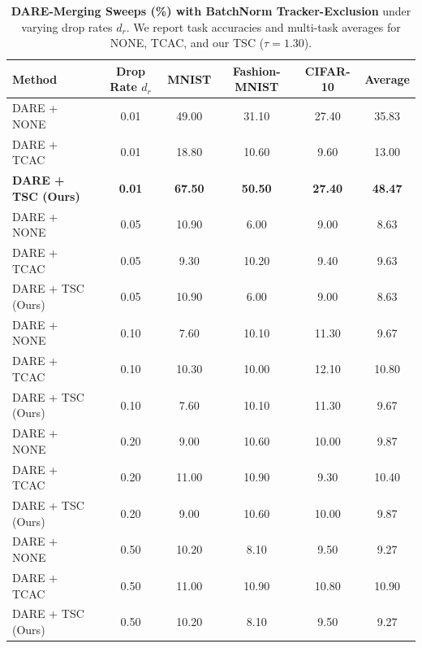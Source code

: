 \documentclass{article}
\theoremstyle{plain}
\theoremstyle{definition}
\theoremstyle{remark}
\begin{document}
\begin{table}[h]
\caption{\textbf{DARE-Merging Sweeps (\%) with BatchNorm Tracker-Exclusion} under varying drop rates $d_r$. We report task accuracies and multi-task averages for NONE, TCAC, and our TSC ($\tau = 1.30$).}
\label{tab:dare_sweep}
\vskip 0.1in
\begin{center}
\begin{small}
\begin{sc}
\begin{tabular}{lccccc}
\toprule
Method & Drop Rate $d_r$ & MNIST & Fashion-MNIST & CIFAR-10 & \textbf{Average} \\
\midrule
DARE + NONE & 0.01 & 49.00 & 31.10 & 27.40 & 35.83 \\
DARE + TCAC & 0.01 & 18.80 & 10.60 & 9.60 & 13.00 \\
\textbf{DARE + TSC (Ours)} & \textbf{0.01} & \textbf{67.50} & \textbf{50.50} & \textbf{27.40} & \textbf{48.47} \\
\midrule
DARE + NONE & 0.05 & 10.90 & 6.00 & 9.00 & 8.63 \\
DARE + TCAC & 0.05 & 9.30 & 10.20 & 9.40 & 9.63 \\
DARE + TSC (Ours) & 0.05 & 10.90 & 6.00 & 9.00 & 8.63 \\
\midrule
DARE + NONE & 0.10 & 7.60 & 10.10 & 11.30 & 9.67 \\
DARE + TCAC & 0.10 & 10.30 & 10.00 & 12.10 & 10.80 \\
DARE + TSC (Ours) & 0.10 & 7.60 & 10.10 & 11.30 & 9.67 \\
\midrule
DARE + NONE & 0.20 & 9.00 & 10.60 & 10.00 & 9.87 \\
DARE + TCAC & 0.20 & 11.00 & 10.90 & 9.30 & 10.40 \\
DARE + TSC (Ours) & 0.20 & 9.00 & 10.60 & 10.00 & 9.87 \\
\midrule
DARE + NONE & 0.50 & 10.20 & 8.10 & 9.50 & 9.27 \\
DARE + TCAC & 0.50 & 11.00 & 10.90 & 10.80 & 10.90 \\
DARE + TSC (Ours) & 0.50 & 10.20 & 8.10 & 9.50 & 9.27 \\
\bottomrule
\end{tabular}
\end{sc}
\end{small}
\end{center}
\end{table}
\end{document}
